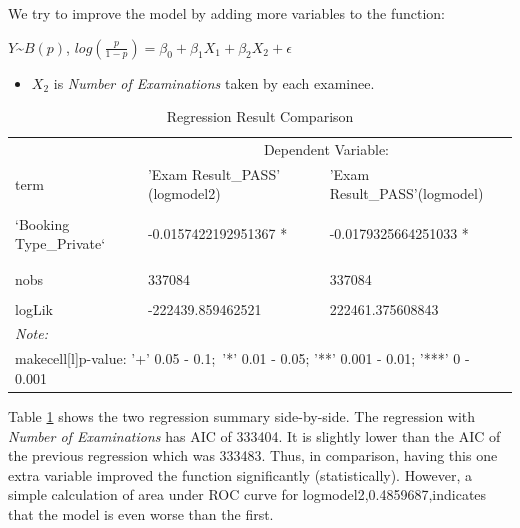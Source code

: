 \documentclass[11pt,a4paper,]{article}
\providecommand{\tightlist}{%
  \setlength{\itemsep}{0pt}\setlength{\parskip}{0pt}}
\begin{document}
We try to improve the model by adding more variables to the function:

\(Y\)\textasciitilde{}\(B(p)\), \(log(\frac{p}{1-p}) = \beta_0 +\beta_1 X_1 +\beta_2 X_2 + \epsilon\)

\begin{itemize}
\tightlist
\item
  \(X_2\) is \emph{Number of Examinations} taken by each examinee.
\end{itemize}

\begin{table}[!h]

\caption{\label{tab:comparison}Regression Result Comparison}
\centering
\begin{tabular}[t]{lll}
\toprule
\multicolumn{1}{c}{ } & \multicolumn{2}{c}{Dependent Variable:} \\
\cmidrule(l{3pt}r{3pt}){2-3}
term & 'Exam Result\_PASS' (logmodel2) & 'Exam Result\_PASS'(logmodel)\\
\midrule
\cellcolor{gray!6}{(Intercept)} & \cellcolor{gray!6}{0.522573474570028 ***} & \cellcolor{gray!6}{0.533407196218835 ***}\\
`Booking Type\_Private` & -0.0157422192951367 * & -0.0179325664251033 *\\
\addlinespace[0.3em]
\multicolumn{3}{l}{\textbf{ }}\\
\cellcolor{gray!6}{\hspace{1em}`Number of Examinations`} & \cellcolor{gray!6}{0.00169271410738006 ***} & \cellcolor{gray!6}{}\\
\hspace{1em}nobs & 337084 & 337084\\
\cellcolor{gray!6}{\hspace{1em}AIC} & \cellcolor{gray!6}{444885.718925042} & \cellcolor{gray!6}{444926.751217685}\\
logLik & -222439.859462521 & 222461.375608843\\
\bottomrule
\multicolumn{3}{l}{\rule{0pt}{1em}\textit{Note: }}\\
\multicolumn{3}{l}{\rule{0pt}{1em}makecell[l]{p-value: '+' 0.05 - 0.1;\           '*' 0.01 - 0.05; '**' 0.001 - 0.01; '***' 0 - 0.001}}\\
\end{tabular}
\end{table}

Table \ref{tab:comparison} shows the two regression summary side-by-side. The regression with \emph{Number of Examinations} has AIC of 333404. It is slightly lower than the AIC of the previous regression which was 333483. Thus, in comparison, having this one extra variable improved the function significantly (statistically). However, a simple calculation of area under ROC curve for logmodel2,0.4859687,indicates that the model is even worse than the first.
\end{document}
